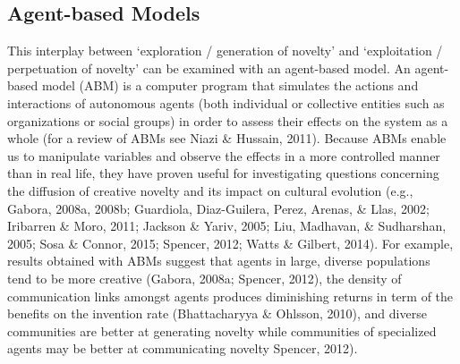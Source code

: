 \documentclass[a4paper,12pt,man,british]{apa6}
\begin{document}
\subsection{Agent-based Models}
This interplay between `exploration / generation of novelty' and `exploitation / perpetuation of novelty' can be examined with an agent-based model.
An agent-based model (ABM) is a computer program that simulates the actions and interactions of autonomous agents (both individual or collective entities such as organizations or social groups) in order to assess their effects on the system as a whole (for a review of ABMs see Niazi \& Hussain, 2011). 
Because ABMs enable us to manipulate variables and observe the effects in a more controlled manner than in real life, they have proven useful for investigating questions concerning the diffusion of creative novelty and its impact on cultural evolution (e.g., Gabora, 2008a, 2008b; Guardiola, Diaz-Guilera, Perez, Arenas, \& Llas, 2002; Iribarren \& Moro, 2011; Jackson \& Yariv, 2005; Liu, Madhavan, \& Sudharshan, 2005; Sosa \& Connor, 2015; Spencer, 2012; Watts \& Gilbert, 2014). For example, results obtained with ABMs suggest that agents in large, diverse populations tend to be more creative (Gabora, 2008a; Spencer, 2012), the density of communication links amongst agents produces diminishing returns in term of the benefits on the invention rate (Bhattacharyya \& Ohlsson, 2010), and diverse communities are better at generating novelty while communities of specialized agents may be better at communicating novelty Spencer, 2012). 
\end{document}
